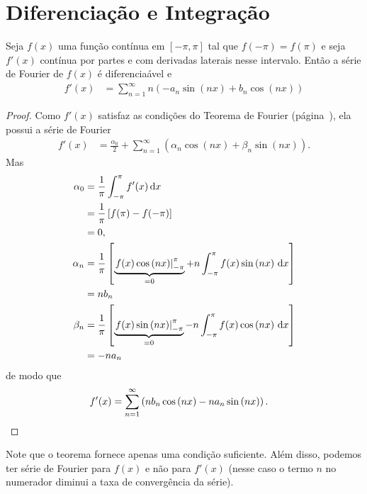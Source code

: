 \section{Diferencia\c{c}\~{a}o e Integra\c{c}\~{a}o}
\begin{teo}
    Seja $f(x)$ uma fun\c{c}\~{a}o cont\'{i}nua em $[-\pi,\pi]$ tal que $f(-\pi) = f(\pi)$ e seja $f'(x)$ cont\'{i}nua por partes e com derivadas laterais nesse intervalo. Ent\~{a}o a s\'{e}rie de Fourier de $f(x)$ \'{e} diferencia\'{a}vel e
    \begin{align*}
        f'(x) &= \sum_{n = 1}^\infty n \left( -a_n \sin\left( n x \right) + b_n \cos\left( n x \right) \right)
    \end{align*}
\end{teo}
\begin{proof}
    Como $f'(x)$ satisfaz as condi\c{c}\~{o}es do Teorema de Fourier (p\'{a}gina~\pageref{teo:fourier}), ela possui a s\'{e}rie de Fourier
    \begin{align*}
        f'(x) &= \frac{\alpha_0}{2} + \sum_{n = 1}^\infty \left( \alpha_n \cos\left( n x \right) + \beta_n \sin\left( n x \right) \right).
    \end{align*}
    Mas
    \begin{align*}
        \alpha_0 &= \frac{1}{\pi} \int_{-\pi}^\pi f'(x) \, \mathrm{d}x \\
        &= \frac{1}{\pi} \left[ f(\pi) - f(-\pi) \right] \\
        &= 0, \\
        \alpha_n &= \frac{1}{\pi} \left[ \underbrace{\left. f(x) \cos\left( n x \right) \right|_{-\pi}^\pi}_{=0} + n \int_{-\pi}^\pi f(x) \sin\left( n x \right) \, \mathrm{d}x \right] \\
        &= n b_n \\
        \beta_n &= \frac{1}{\pi} \left[ \underbrace{\left. f(x) \sin\left( n x \right) \right|_{-\pi}^\pi}_{=0} - n \int_{-\pi}^\pi f(x) \cos\left( n x \right) \, \mathrm{d}x \right] \\
        &= -n a_n
    \end{align*}
    de modo que
    \begin{align*}
        f'(x) &= \sum_{n = 1}^\infty \left( n b_n \cos\left( n x \right) - n a_n \sin\left( n x \right) \right). \qedhere
    \end{align*}
\end{proof}
\begin{obs}
    Note que o teorema fornece apenas uma condi\c{c}\~{a}o suficiente. Al\'{e}m disso, podemos ter s\'{e}rie de Fourier para $f(x)$ e n\~{a}o para $f'(x)$ (nesse caso o termo $n$ no numerador diminui a taxa de converg\^{e}ncia da s\'{e}rie).
\end{obs}
